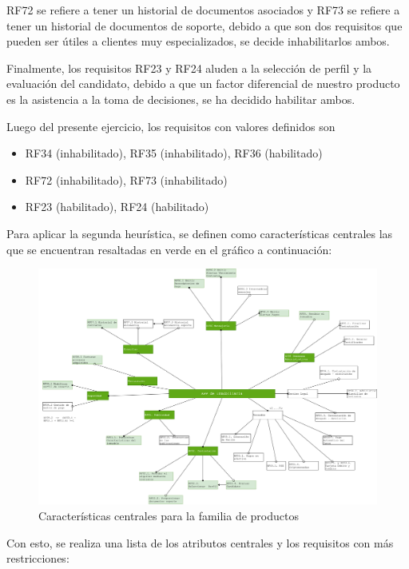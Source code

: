 \documentclass[letterpaper]{article}
\begin{document}
RF72 se refiere a tener un historial de documentos asociados y RF73 se refiere a tener un historial de documentos de soporte, debido a que son dos requisitos que pueden ser útiles a clientes muy especializados, se decide inhabilitarlos ambos.

Finalmente, los requisitos RF23 y RF24 aluden a la selección de perfil y la evaluación del candidato, debido a que un factor diferencial de nuestro producto es la asistencia a la toma de decisiones, se ha decidido habilitar ambos.

Luego del presente ejercicio, los requisitos con valores definidos son 

\begin{itemize}
    \item RF34 (inhabilitado), RF35 (inhabilitado), RF36 (habilitado)
    \item RF72 (inhabilitado), RF73 (inhabilitado)
    \item RF23 (habilitado), RF24 (habilitado)
\end{itemize}

Para aplicar la segunda heurística, se definen como características centrales las que se encuentran resaltadas en verde en el gráfico a continuación:

\begin{figure}
    \centering
    \includegraphics{images/reqprior.png}
    \caption{Características centrales para la familia de productos}
    \label{fig:core_feats}
\end{figure}

Con esto, se realiza una lista de los atributos centrales y los requisitos con más restricciones:
\end{document}
